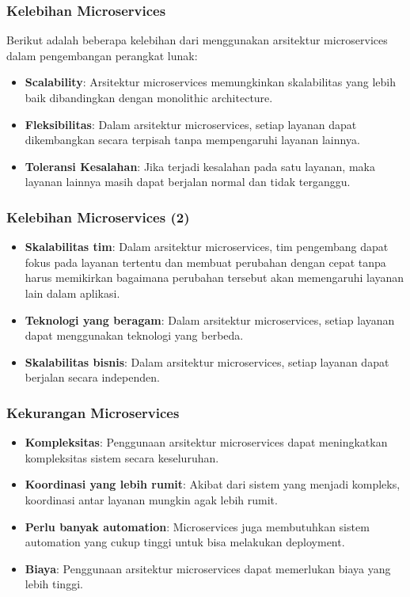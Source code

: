 \documentclass[aspectratio=169, table]{beamer}
\begin{document}
    \begin{frame}
        \frametitle{Kelebihan Microservices}
        Berikut adalah beberapa kelebihan dari menggunakan arsitektur microservices dalam pengembangan perangkat lunak:
        \begin{itemize}
            \item \textbf{Scalability}: Arsitektur microservices memungkinkan skalabilitas yang lebih baik dibandingkan dengan monolithic architecture.
            \item \textbf{Fleksibilitas}: Dalam arsitektur microservices, setiap layanan dapat dikembangkan secara terpisah tanpa mempengaruhi layanan lainnya.
            \item \textbf{Toleransi Kesalahan}: Jika terjadi kesalahan pada satu layanan, maka layanan lainnya masih dapat berjalan normal dan tidak terganggu.
        \end{itemize}
    \end{frame}

    \begin{frame}
        \frametitle{Kelebihan Microservices (2)}

        \begin{itemize}
            \item \textbf{Skalabilitas tim}: Dalam arsitektur microservices, tim pengembang dapat fokus pada layanan tertentu dan membuat perubahan dengan cepat tanpa harus memikirkan bagaimana perubahan tersebut akan memengaruhi layanan lain dalam aplikasi.
            \item \textbf{Teknologi yang beragam}: Dalam arsitektur microservices, setiap layanan dapat menggunakan teknologi yang berbeda.
            \item \textbf{Skalabilitas bisnis}: Dalam arsitektur microservices, setiap layanan dapat berjalan secara independen.
        \end{itemize}
    \end{frame}

    \begin{frame}
        \frametitle{Kekurangan Microservices}
        \begin{itemize}
            \item \textbf{Kompleksitas}: Penggunaan arsitektur microservices dapat meningkatkan kompleksitas sistem secara keseluruhan.
            \item \textbf{Koordinasi yang lebih rumit}: Akibat dari sistem yang menjadi kompleks, koordinasi antar layanan mungkin agak lebih rumit.
            \item \textbf{Perlu banyak automation}: Microservices juga membutuhkan sistem automation yang cukup tinggi untuk bisa melakukan deployment.
            \item \textbf{Biaya}: Penggunaan arsitektur microservices dapat memerlukan biaya yang lebih tinggi.
        \end{itemize}
    \end{frame}
\end{document}
